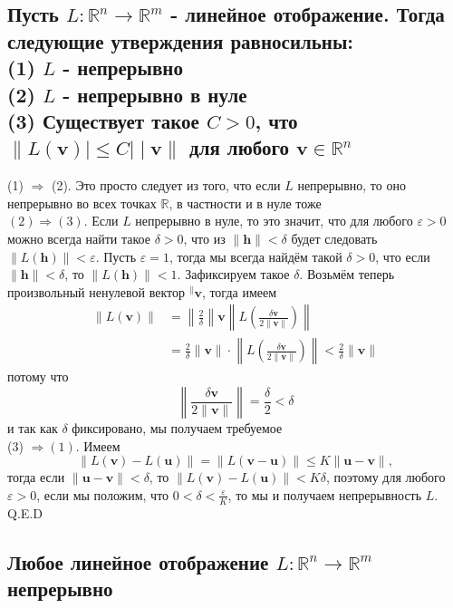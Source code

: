 \documentclass[a4paper]{article}
\begin{document}
\subsection{Пусть $L: \mathbb{R}^n \rightarrow \mathbb{R}^m$ - линейное отображение. Тогда следующие утверждения равносильны:\\
(1) $L$ - непрерывно\\
(2) $L$ - непрерывно в нуле\\
(3) Существует такое $C>0$, что $\|L(\mathbf{v})|\leq C| \mid \mathbf{v}\|$ для любого $\mathbf{v} \in \mathbb{R}^n$}
(1) $\Longrightarrow$ (2). Это просто следует из того, что если $L$ непрерывно, то оно непрерывно во всех точках $\mathbb{R}$, в частности и в нуле тоже\\[2mm]
$(2) \Longrightarrow(3)$. Если $L$ непрерывно в нуле, то это значит, что для любого $\varepsilon>0$ можно всегда найти такое $\delta>0$, что из $\|\mathbf{h}\|<\delta$ будет следовать $\|L(\mathbf{h})\|<\varepsilon$. Пусть $\varepsilon=1$, тогда мы всегда найдём такой $\delta>0$, что если $\|\mathbf{h}\|<\delta$, то $\|L(\mathbf{h})\|<1$. Зафиксируем такое $\delta$.
Возьмём теперь произвольный ненулевой вектор ${ }^{\|} \mathbf{v}$, тогда имеем
$$
\begin{aligned}
\|L(\mathbf{v})\| & =\left\|\frac{2}{\delta}\right\| \mathbf{v}\left\|L\left(\frac{\delta \mathbf{v}}{2\|\mathbf{v}\|}\right)\right\| \\
& =\frac{2}{\delta}\|\mathbf{v}\| \cdot\left\|L\left(\frac{\delta \mathbf{v}}{2\|\mathbf{v}\|}\right)\right\|<\frac{2}{\delta}\|\mathbf{v}\|
\end{aligned}
$$
потому что
$$
\left\|\frac{\delta \mathbf{v}}{2\|\mathbf{v}\|}\right\|=\frac{\delta}{2}<\delta
$$
и так как $\delta$ фиксировано, мы получаем требуемое\\[2mm]
(3) $\Longrightarrow(1)$. Имеем
$$
\|L(\mathbf{v})-L(\mathbf{u})\|=\|L(\mathbf{v}-\mathbf{u})\| \leq K\|\mathbf{u}-\mathbf{v}\|,
$$
тогда если $\|\mathbf{u}-\mathbf{v}\|<\delta$, то $\|L(\mathbf{v})-L(\mathbf{u})\|<K \delta$, поэтому для любого $\varepsilon>0$, если мы положим, что $0<\delta<\frac{\varepsilon}{K}$, то мы и получаем непрерывность $L$. Q.E.D


\subsection{Любое линейное отображение $L: \mathbb{R}^n \rightarrow \mathbb{R}^m$ непрерывно}
\end{document}

